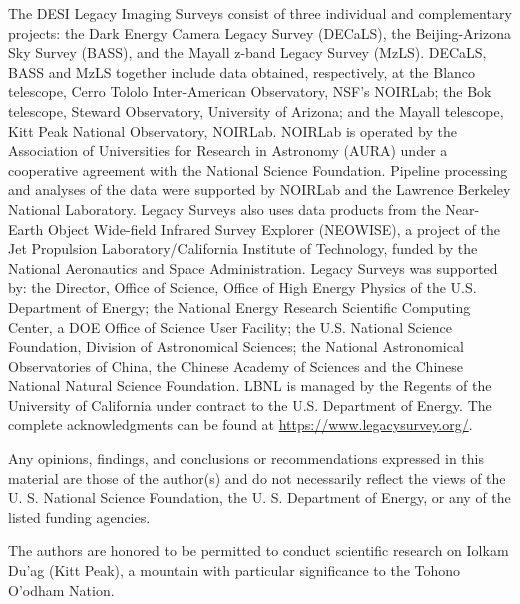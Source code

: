 The DESI Legacy Imaging Surveys consist of three individual and complementary projects: the Dark Energy Camera Legacy Survey (DECaLS), the Beijing-Arizona Sky Survey (BASS), and the Mayall z-band Legacy Survey (MzLS). DECaLS, BASS and MzLS together include data obtained, respectively, at the Blanco telescope, Cerro Tololo Inter-American Observatory, NSF's NOIRLab; the Bok telescope, Steward Observatory, University of Arizona; and the Mayall telescope, Kitt Peak National Observatory, NOIRLab. NOIRLab is operated by the Association of Universities for Research in Astronomy (AURA) under a cooperative agreement with the National Science Foundation. Pipeline processing and analyses of the data were supported by NOIRLab and the Lawrence Berkeley National Laboratory. Legacy Surveys also uses data products from the Near-Earth Object Wide-field Infrared Survey Explorer (NEOWISE), a project of the Jet Propulsion Laboratory/California Institute of Technology, funded by the National Aeronautics and Space Administration. Legacy Surveys was supported by: the Director, Office of Science, Office of High Energy Physics of the U.S. Department of Energy; the National Energy Research Scientific Computing Center, a DOE Office of Science User Facility; the U.S. National Science Foundation, Division of Astronomical Sciences; the National Astronomical Observatories of China, the Chinese Academy of Sciences and the Chinese National Natural Science Foundation. LBNL is managed by the Regents of the University of California under contract to the U.S. Department of Energy. The complete acknowledgments can be found at \href{https://www.legacysurvey.org/}{https://www.legacysurvey.org/}.

Any opinions, findings, and conclusions or recommendations expressed in this material are those of the author(s) and do not necessarily reflect the views of the U. S. National Science Foundation, the U. S. Department of Energy, or any of the listed funding agencies.

The authors are honored to be permitted to conduct scientific research on Iolkam Du’ag (Kitt Peak), a mountain with particular significance to the Tohono O’odham Nation.